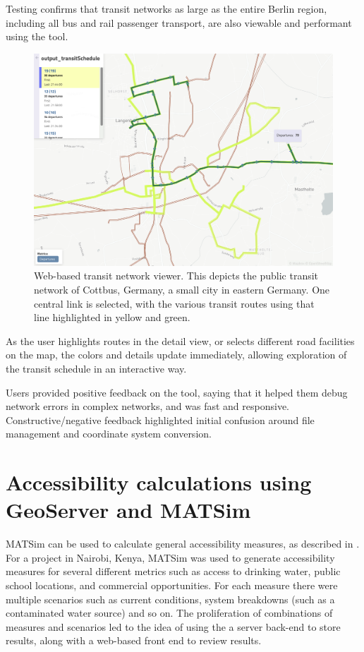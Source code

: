 Testing confirms that transit networks as large as the entire Berlin region, including all bus and rail passenger transport, are also viewable and performant using the tool.

\begin{figure}[!ht]
  \includegraphics[width=\textwidth]{chapters/12-server-experiments/images/transit-viewer.png}
  \caption[Web-based transit network viewer]{Web-based transit network viewer. This depicts the public transit network of Cottbus, Germany, a small city in eastern Germany. One central link is selected, with the various transit routes using that line highlighted in yellow and green.}
  \label{fig:transit-viewer}
\end{figure}

As the user highlights routes in the detail view, or selects different road facilities on the map, the colors and details update immediately, allowing exploration of the transit schedule in an interactive way.

Users provided positive feedback on the tool, saying that it helped them debug network errors in complex networks, and was fast and responsive. Constructive/negative feedback highlighted initial confusion around file management and coordinate system conversion.

\hypertarget{server-experiments-geoserver}{%
\section{Accessibility calculations using GeoServer and MATSim}\label{server-experiments-geoserver}}

MATSim can be used to calculate general accessibility measures, as described in \cite{ziemke2018accessibility}. For a project in Nairobi, Kenya, MATSim was used to generate accessibility measures for several different metrics such as access to drinking water, public school locations, and commercial opportunities. For each measure there were multiple scenarios such as current conditions, system breakdowns (such as a contaminated water source) and so on. The proliferation of combinations of measures and scenarios led to the idea of using the a server back-end to store results, along with a web-based front end to review results.

